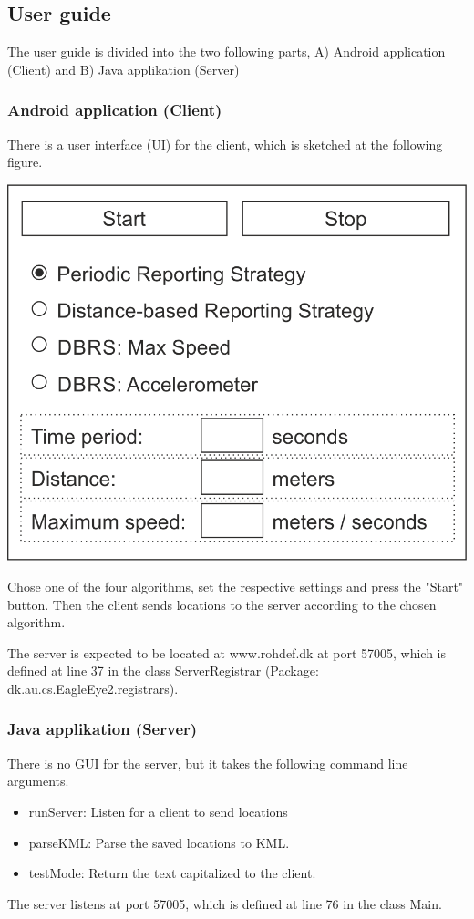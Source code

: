 \subsection{User guide}
The user guide is divided into the two following parts, A) Android application (Client) and B) Java applikation (Server)

\subsubsection{Android application (Client)}
There is a user interface (UI) for the client, which is sketched at the following figure.

\includegraphics{GUI}

Chose one of the four algorithms, set the respective settings and press the "Start" button. Then the client sends locations to the server according to the chosen algorithm.

The server is expected to be located at www.rohdef.dk at port 57005, which is defined at line 37 in the class ServerRegistrar (Package: dk.au.cs.EagleEye2.registrars).

\subsubsection{Java applikation (Server)}
There is no GUI for the server, but it takes the following command line arguments.

\begin{itemize} \itemsep1pt \parskip0pt 
  \item runServer: Listen for a client to send locations
  \item parseKML: Parse the saved locations to KML.
  \item testMode: Return the text capitalized to the client.
\end{itemize}

The server listens at port 57005, which is defined at line 76 in the class Main.